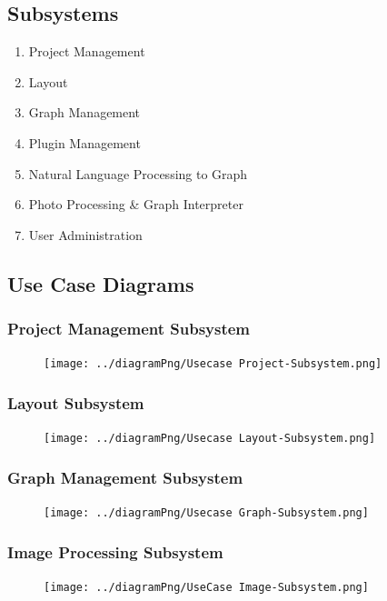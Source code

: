 \documentclass[11pt,a4paper]{article}
\begin{document}
\subsection*{Subsystems}
\begin{enumerate}
    \item Project Management
    \item Layout
    \item Graph Management
    \item Plugin Management
    \item Natural Language Processing to Graph
    \item Photo Processing \& Graph Interpreter
    \item User Administration
\end{enumerate}

\pagebreak

\subsection*{Use Case Diagrams}

\subsubsection*{Project Management Subsystem}
\begin{figure}[htbp]
    \centering
    \texttt{[image: ../diagramPng/Usecase Project-Subsystem.png]}
\end{figure}

\pagebreak
\subsubsection*{Layout Subsystem}
\begin{figure}[htbp]
    \centering
     \texttt{[image: ../diagramPng/Usecase Layout-Subsystem.png]}
\end{figure}

\subsubsection*{Graph Management Subsystem}
\begin{figure}[htbp]
    \centering
    \texttt{[image: ../diagramPng/Usecase Graph-Subsystem.png]}
\end{figure}

\pagebreak
\subsubsection*{Image Processing Subsystem}
\begin{figure}[htbp]
    \centering
    \texttt{[image: ../diagramPng/UseCase Image-Subsystem.png]}
\end{figure}
\end{document}
